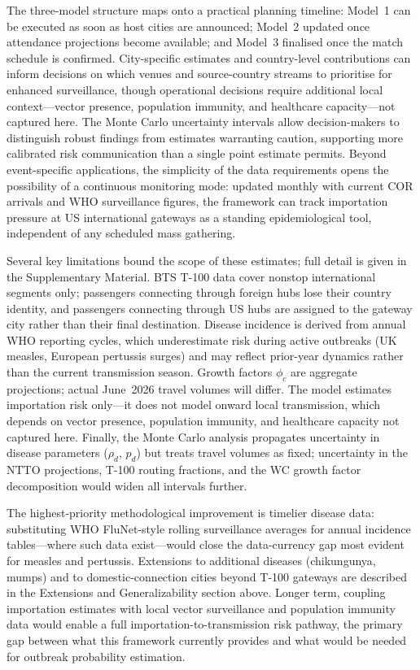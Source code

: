 \documentclass[12pt]{article}
\begin{document}
The three-model structure maps onto a practical planning timeline:
Model~1 can be executed as soon as host cities are announced;
Model~2 updated once attendance projections become available; and
Model~3 finalised once the match schedule is confirmed. City-specific
estimates and country-level contributions can inform decisions on which
venues and source-country streams to prioritise for enhanced
surveillance, though operational decisions require additional local
context---vector presence, population immunity, and healthcare
capacity---not captured here. The Monte Carlo uncertainty intervals
allow decision-makers to distinguish robust findings from estimates
warranting caution, supporting more calibrated risk communication than
a single point estimate permits. Beyond event-specific applications,
the simplicity of the data requirements opens the possibility of a
continuous monitoring mode: updated monthly with current COR arrivals
and WHO surveillance figures, the framework can track importation
pressure at US international gateways as a standing epidemiological
tool, independent of any scheduled mass gathering.

Several key limitations bound the scope of these estimates; full detail
is given in the Supplementary Material. BTS T-100 data cover nonstop
international segments only; passengers connecting through foreign hubs
lose their country identity, and passengers connecting through US hubs
are assigned to the gateway city rather than their final destination.
Disease incidence is derived from annual WHO reporting cycles, which
underestimate risk during active outbreaks (UK measles, European
pertussis surges) and may reflect prior-year dynamics rather than the
current transmission season. Growth factors $\phi_c$ are aggregate
projections; actual June~2026 travel volumes will differ. The model
estimates importation risk only---it does not model onward local
transmission, which depends on vector presence, population immunity,
and healthcare capacity not captured here. Finally, the Monte Carlo
analysis propagates uncertainty in disease parameters ($\rho_d$,
$p_d$) but treats travel volumes as fixed; uncertainty in the NTTO
projections, T-100 routing fractions, and the WC growth factor
decomposition would widen all intervals further.

The highest-priority methodological improvement is timelier disease
data: substituting WHO FluNet-style rolling surveillance averages for
annual incidence tables---where such data exist---would close the
data-currency gap most evident for measles and pertussis. Extensions
to additional diseases (chikungunya, mumps) and to domestic-connection
cities beyond T-100 gateways are described in the Extensions and
Generalizability section above. Longer term, coupling importation
estimates with local vector surveillance and population immunity data
would enable a full importation-to-transmission risk pathway, the
primary gap between what this framework currently provides and what
would be needed for outbreak probability estimation.
\end{document}

